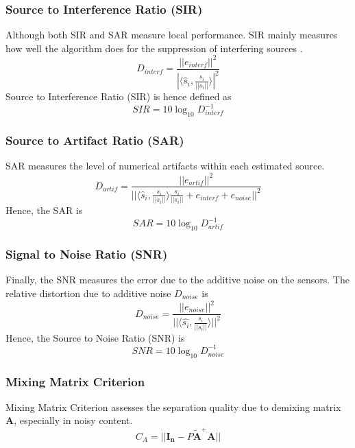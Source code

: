 \subsubsection{Source to Interference Ratio (SIR)}
Although both SIR and SAR measure local performance. 
SIR mainly measures how well the algorithm does for the suppression of interfering sources \cite{performanceMeasure}.
\begin{equation}
    D_{interf} = \frac{||e_{interf}||^2}{|\big\langle \hat{s}_i, \frac{s_i}{||s_i||} \big\rangle |^2}
\end{equation}
Source to Interference Ratio (SIR) is hence defined as
\begin{equation}
    SIR = 10\log_{10} D^{-1}_{interf}
\end{equation}

\subsubsection{Source to Artifact Ratio (SAR)}
SAR measures the level of numerical artifacts within each estimated source.
\begin{equation}
    D_{artif} = \frac{||e_{artif}||^2}
    {|| \big\langle \hat{s}_i, \frac{s_i}{||s_i||}\big\rangle  \frac{s_i}{||s_i||} + e_{interf} + e_{noise}||^2}
\end{equation}
Hence, the SAR is 
\begin{equation}
    SAR = 10\log_{10} D^{-1}_{artif}
\end{equation}

\subsubsection{Signal to Noise Ratio (SNR)}
Finally, the SNR measures the error due to the additive noise on the sensors. The relative distortion due to additive noise $D_{noise}$ is
\begin{equation}
    D_{noise} = \frac{||e_{noise}||^2}{||\big \langle \hat{s_i},\frac{s_i}{||s_i||}\big \rangle||^2}
\end{equation}
Hence, the Source to Noise Ratio (SNR) is
\begin{equation}
    SNR = 10\log_{10} D^{-1}_{noise}
\end{equation}

\subsubsection{Mixing Matrix Criterion}
Mixing Matrix Criterion assesses the separation quality due to demixing matrix $\mathbf{A}$, especially in noisy content.
\begin{equation}
    C_A = ||\mathbf{I_n} - P\tilde{\mathbf{A}}^{+}\mathbf{A} ||
\end{equation}

